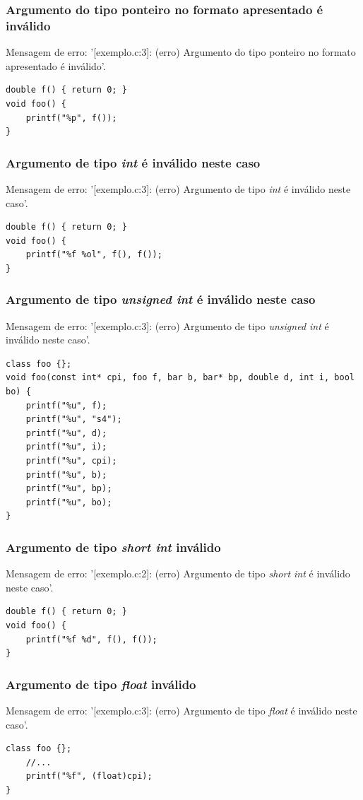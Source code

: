 \documentclass[12pt,a4paper]{report}
\begin{document}
\subsubsection{Argumento do tipo ponteiro no formato apresentado é inválido}
Mensagem de erro: '[exemplo.c:3]: (erro) Argumento do tipo ponteiro no formato apresentado é inválido'.
\begin{lstlisting}[style=CStyle]
double f() { return 0; }
void foo() { 
    printf("%p", f());
}
\end{lstlisting}

\subsubsection{Argumento de tipo \textit{int} é inválido neste caso}
Mensagem de erro: '[exemplo.c:3]: (erro) Argumento de tipo \textit{int} é inválido neste caso'.
\begin{lstlisting}[style=CStyle]
double f() { return 0; }
void foo() { 
    printf("%f %ol", f(), f());
}
\end{lstlisting}

\subsubsection{Argumento de tipo \textit{unsigned int} é inválido neste caso}
Mensagem de erro: '[exemplo.c:3]: (erro) Argumento de tipo \textit{unsigned int} é inválido neste caso'.
\begin{lstlisting}[style=CStyle]
class foo {};
void foo(const int* cpi, foo f, bar b, bar* bp, double d, int i, bool bo) {
    printf("%u", f);
    printf("%u", "s4");
    printf("%u", d);
    printf("%u", i);
    printf("%u", cpi);
    printf("%u", b);
    printf("%u", bp);
    printf("%u", bo);
}
\end{lstlisting}

\subsubsection{Argumento de tipo \textit{short int} inválido}
Mensagem de erro: '[exemplo.c:2]: (erro) Argumento de tipo \textit{short int} é inválido neste caso'.
\begin{lstlisting}[style=CStyle]
double f() { return 0; }
void foo() { 
    printf("%f %d", f(), f());
}
\end{lstlisting}

\subsubsection{Argumento de tipo \textit{float} inválido}
Mensagem de erro: '[exemplo.c:3]: (erro) Argumento de tipo \textit{float} é inválido neste caso'.
\begin{lstlisting}[style=CStyle]
class foo {};
    //...
    printf("%f", (float)cpi);
}
\end{lstlisting}
\end{document}
